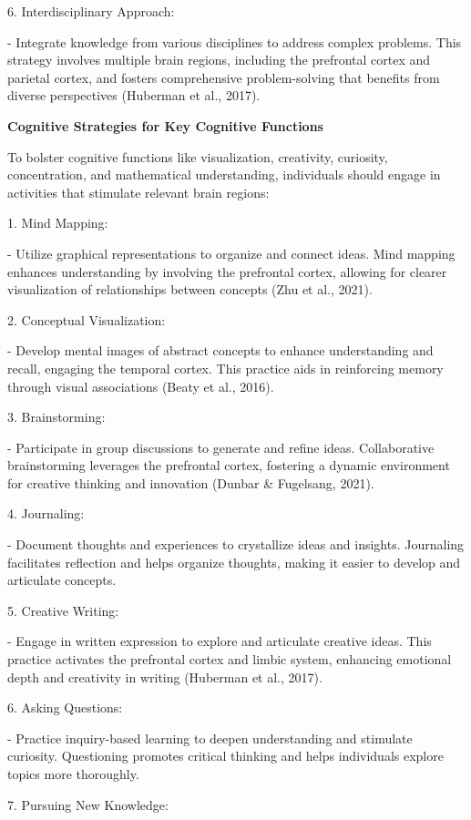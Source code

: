 \documentclass[
]{article}
\begin{document}
6. Interdisciplinary Approach:

- Integrate knowledge from various disciplines to address complex
problems. This strategy involves multiple brain regions, including the
prefrontal cortex and parietal cortex, and fosters comprehensive
problem-solving that benefits from diverse perspectives (Huberman et
al., 2017).

\textbf{Cognitive Strategies for Key Cognitive Functions}

To bolster cognitive functions like visualization, creativity,
curiosity, concentration, and mathematical understanding, individuals
should engage in activities that stimulate relevant brain regions:

1. Mind Mapping:

- Utilize graphical representations to organize and connect ideas. Mind
mapping enhances understanding by involving the prefrontal cortex,
allowing for clearer visualization of relationships between concepts
(Zhu et al., 2021).

2. Conceptual Visualization:

- Develop mental images of abstract concepts to enhance understanding
and recall, engaging the temporal cortex. This practice aids in
reinforcing memory through visual associations (Beaty et al., 2016).

3. Brainstorming:

- Participate in group discussions to generate and refine ideas.
Collaborative brainstorming leverages the prefrontal cortex, fostering a
dynamic environment for creative thinking and innovation (Dunbar \&
Fugelsang, 2021).

4. Journaling:

- Document thoughts and experiences to crystallize ideas and insights.
Journaling facilitates reflection and helps organize thoughts, making it
easier to develop and articulate concepts.

5. Creative Writing:

- Engage in written expression to explore and articulate creative ideas.
This practice activates the prefrontal cortex and limbic system,
enhancing emotional depth and creativity in writing (Huberman et al.,
2017).

6. Asking Questions:

- Practice inquiry-based learning to deepen understanding and stimulate
curiosity. Questioning promotes critical thinking and helps individuals
explore topics more thoroughly.

7. Pursuing New Knowledge:
\end{document}
